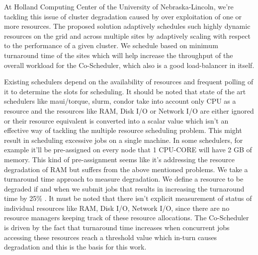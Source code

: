 \documentclass[ms,electronic,double]{nuthesis}
\begin{document}
At Holland Computing Center of the University of Nebraska-Lincoln, we're 
tackling this issue of cluster degradation caused by 
over exploitation of one or more resources. 
The proposed solution adaptively schedules 
such highly dynamic resources on the grid and across multiple sites by adaptively scaling with respect to
the performance of a given cluster. We schedule based on minimum turnaround time of the sites which will help increase 
the throughput of the overall workload for the Co-Scheduler, which also is a good load-balancer in itself.

Existing schedulers depend on the availability of resources and frequent polling 
of it to determine the slots for scheduling. It should be noted that state of the art 
schedulers like maui/torque, slurm, condor take into account only CPU as a 
resource and the resources like RAM, Disk I/O or Network I/O are either ignored or 
their resource equivalent is converted into a scalar value which isn't an effective way of tackling the 
multiple resource scheduling problem. This might result in scheduling excessive jobs 
on a single machine. In some schedulers, for example it'll be pre-assigned on every node that 1 CPU-CORE will have 2 GB of
memory. This kind of pre-assignment seems like it's addressing the resource degradation of RAM but suffers 
from the above mentioned problems. We take a turnaround time approach to measure degradation. We define a resource 
to be degraded if and when we submit jobs that results in increasing the 
turnaround time by 25\% . It must be 
noted that there isn't explicit measurement of status of individual resources like RAM, Disk I/O, 
Network I/O, since there are no resource managers keeping track of these resource allocations. 
The Co-Scheduler is driven by the fact that turnaround time increases when 
concurrent jobs accessing these resources reach a threshold value which in-turn causes 
degradation and this is the basis for this work.
\end{document}

